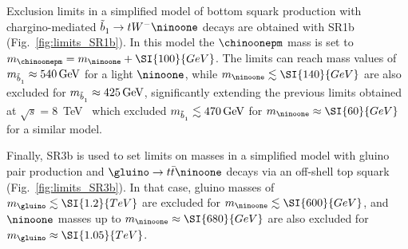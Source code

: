 Exclusion limits in a simplified model of bottom squark production with chargino-mediated $\sbottomone\to tW^-\ninoone$ decays are 
obtained with SR1b (Fig.~\ref{fig:limits_SR1b}).
In this model the $\chinoonepm$ mass is set to $m_{\chinoonepm}=m_{\ninoone} + \SI{100}{GeV}$.
The limits can reach mass values of $m_{\tilde{b}^{}_1}\approx\SI{540}{GeV}$ for a light $\ninoone$, 
while $m_{\ninoone}\lesssim\SI{140}{GeV}$ are also excluded for $m_{\tilde{b}^{}_1}\approx\SI{425}{GeV}$, 
significantly extending the previous limits obtained at $\sqrt{s}=8$~TeV~\cite{Aad:2015pfx} 
which excluded $m_{\tilde{b}^{}_1}\lesssim\SI{470}{GeV}$ for $m_{\ninoone}\approx\SI{60}{GeV}$ for a similar model.

Finally, SR3b is used to set limits on masses in a simplified model with 
gluino pair production and $\gluino\to t\bar t\ninoone$ decays 
via an off-shell top squark (Fig.~\ref{fig:limits_SR3b}). 
In that case, gluino masses of $m_{\gluino}\lesssim\SI{1.2}{TeV}$ are excluded for $m_{\ninoone}\lesssim\SI{600}{GeV}$, 
and $\ninoone$ masses up to $m_{\ninoone}\approx\SI{680}{GeV}$ are also excluded for $m_{\gluino}\approx\SI{1.05}{TeV}$. 
